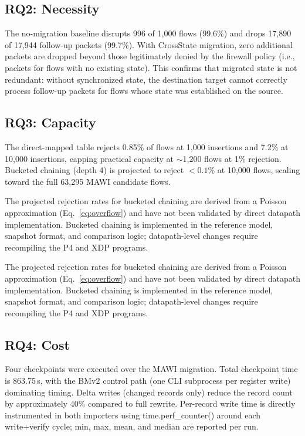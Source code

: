 \documentclass[10pt, conference, compsoc]{IEEEtran}
\begin{document}
\subsection{RQ2: Necessity}
\label{subsec:rq2}
The no-migration baseline disrupts 996 of 1{,}000 flows (99.6\%) and drops
17{,}890 of 17{,}944 follow-up packets (99.7\%). With CrossState migration,
zero additional packets are dropped beyond those legitimately denied by the
firewall policy (i.e., packets for flows with no existing state). This confirms
that migrated state is not redundant: without synchronized state, the
destination target cannot correctly process follow-up packets for flows whose
state was established on the source.

\subsection{RQ3: Capacity}
\label{subsec:rq3}
The direct-mapped table rejects 0.85\% of flows at 1{,}000 insertions and 7.2\%
at 10{,}000 insertions, capping practical capacity at $\sim$1{,}200 flows at
1\% rejection. Bucketed chaining (depth 4) is projected to reject $<0.1\%$ at
10{,}000 flows, scaling toward the full 63{,}295 MAWI candidate flows.

The projected rejection rates for bucketed chaining are derived from a Poisson
approximation (Eq.~\ref{eq:overflow}) and have not been validated by direct
datapath implementation. Bucketed chaining is implemented in the reference
model, snapshot format, and comparison logic; datapath-level changes require
recompiling the P4 and XDP programs.

The projected rejection rates for bucketed chaining are derived from a Poisson
approximation (Eq.~\ref{eq:overflow}) and have not been validated by direct
datapath implementation. Bucketed chaining is implemented in the reference
model, snapshot format, and comparison logic; datapath-level changes require
recompiling the P4 and XDP programs.

\subsection{RQ4: Cost}
\label{subsec:rq4}
Four checkpoints were executed over the MAWI migration. Total checkpoint time
is 863.75\,s, with the BMv2 control path (one CLI subprocess per register
write) dominating timing. Delta writes (changed records only) reduce the record
count by approximately 40\% compared to full rewrite. Per-record write time is
directly instrumented in both importers using time.perf\_counter() around each
write+verify cycle; min, max, mean, and median are reported per run.
\end{document}
